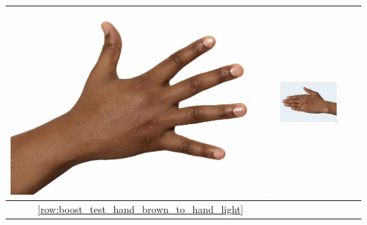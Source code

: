 \begin{longtable}{|c||c|c|c|}
\begin{minipage}{.29\textwidth}
    \includegraphics[width=\textwidth,height=\textheight,keepaspectratio]{../inputs/hand_dark.jpg}
  \end{minipage} & 
  \begin{minipage}{.29\textwidth}
    \includegraphics[width=\textwidth,height=\textheight,keepaspectratio]{../rc_test/outputs/20170516_boost_test/hand_brown_to_hand_dark.jpg}
  \end{minipage} \\
\hline  \ref{row:boost_test_hand_brown_to_hand_light} &
  \begin{minipage}{.29\textwidth}

\end{minipage}
\end{longtable}
